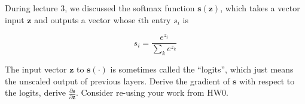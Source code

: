 
During lecture 3, we discussed the softmax function $\mathbf{s}(\mathbf{z})$, which takes a vector input $\mathbf{z}$ and outputs a vector whose $i$th entry $s_i$ is

\begin{equation}
s_i = \frac{e^{z_{i}}}{\sum_{k} e^{z_{k}}}
\end{equation}

The input vector $\mathbf{z}$ to $\mathbf{s}(\cdot)$ is sometimes called the ``logits'', which just means the unscaled output of previous layers. Derive the gradient of $\mathbf{s}$ with respect to the logits, \ie derive $\frac{\partial \mathbf{s}}{\partial \mathbf{z}}$. 
Consider re-using your work from HW0.